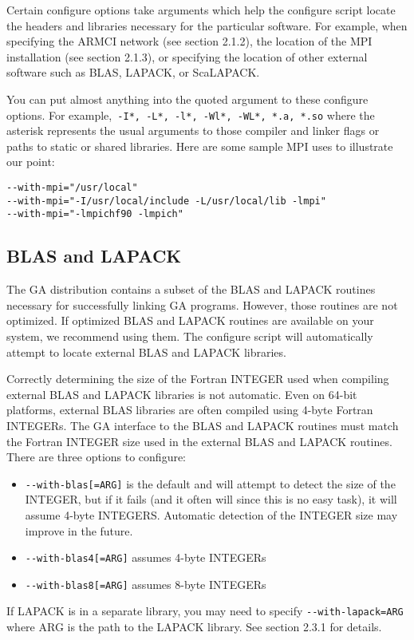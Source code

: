 Certain configure options take arguments which help the configure script locate
the headers and libraries necessary for the particular software. For example,
when specifying the ARMCI network (see section 2.1.2), the location of the MPI
installation (see section 2.1.3), or specifying the location of other external
software such as BLAS, LAPACK, or ScaLAPACK. 

You can put almost anything into the quoted argument to these configure
options. For example,\texttt{ -I{*}, -L{*}, -l{*}, -Wl{*}, -WL{*}, {*}.a,
{*}.so} where the asterisk represents the usual arguments to those compiler and
linker flags or paths to static or shared libraries.  Here are some sample MPI
uses to illustrate our point:
\begin{verbatim}
--with-mpi="/usr/local"
--with-mpi="-I/usr/local/include -L/usr/local/lib -lmpi"
--with-mpi="-lmpichf90 -lmpich"
\end{verbatim}

\subsection{BLAS and LAPACK}

The GA distribution contains a subset of the BLAS and LAPACK routines necessary
for successfully linking GA programs. However, those routines are not
optimized. If optimized BLAS and LAPACK routines are available on your system,
we recommend using them. The configure script will automatically attempt to
locate external BLAS and LAPACK libraries. 

Correctly determining the size of the Fortran INTEGER used when compiling
external BLAS and LAPACK libraries is not automatic. Even on 64-bit platforms,
external BLAS libraries are often compiled using 4-byte Fortran INTEGERs. The
GA interface to the BLAS and LAPACK routines must match the Fortran INTEGER
size used in the external BLAS and LAPACK routines. There are three options to
configure: 
\begin{itemize}
\item \texttt{-{}-with-blas{[}=ARG{]}} is the default and will attempt to
detect the size of the INTEGER, but if it fails (and it often will since this
is no easy task), it will assume 4-byte INTEGERS. Automatic detection of the
INTEGER size may improve in the future.
\item \texttt{-{}-with-blas4{[}=ARG{]}} assumes 4-byte INTEGERs 
\item \texttt{-{}-with-blas8{[}=ARG{]}} assumes 8-byte INTEGERs 
\end{itemize}
If LAPACK is in a separate library, you may need to specify
\texttt{-{}-with-lapack=ARG} where ARG is the path to the LAPACK library. See
section 2.3.1 for details. 

